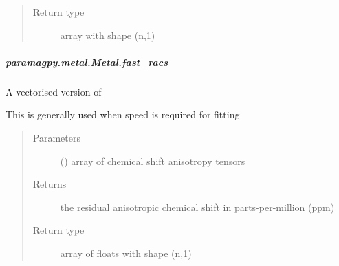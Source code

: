 \documentclass[a4paper,10pt,english,openany,oneside]{sphinxmanual}
\begin{document}
\begin{fulllineitems}
\begin{fulllineitems}
\begin{fulllineitems}
\begin{quote}
\begin{description}
\item[{Return type}] \leavevmode
array with shape (n,1)

\end{description}\end{quote}

\end{fulllineitems}



\subparagraph{paramagpy.metal.Metal.fast\_racs}
\label{\detokenize{reference/generated/paramagpy.metal.Metal.fast_racs:paramagpy-metal-metal-fast-racs}}\label{\detokenize{reference/generated/paramagpy.metal.Metal.fast_racs::doc}}

\begin{fulllineitems}
\label{\detokenize{reference/generated/paramagpy.metal.Metal.fast_racs:paramagpy.metal.Metal.fast_racs}}
A vectorised version of {\hyperref[\detokenize{reference/generated/paramagpy.metal.Metal.racs:paramagpy.metal.Metal.racs}]{}}

This is generally used when speed is required for fitting
\begin{quote}\begin{description}
\item[{Parameters}] \leavevmode
{} (\sphinxstyleliteralemphasis{\sphinxupquote{ (}}\sphinxstyleliteralemphasis{\sphinxupquote{,}}\sphinxstyleliteralemphasis{\sphinxupquote{,}}\sphinxstyleliteralemphasis{\sphinxupquote{)}}) \textendash{} array of chemical shift anisotropy tensors

\item[{Returns}] \leavevmode
{} \textendash{} the residual anisotropic chemical shift in parts-per-million (ppm)

\item[{Return type}] \leavevmode
array of floats with shape (n,1)

\end{description}\end{quote}

\end{fulllineitems}




\end{fulllineitems}
\end{fulllineitems}
\end{document}
